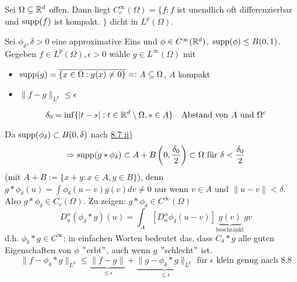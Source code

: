 \begin{kor} \label{kor:8.9}
	Sei $\Omega \subseteq \mathbb{R}^{d}$ offen. Dann liegt $C_{c}^{\infty}(\Omega) = \{ f : f $ ist unendlich oft differenzierbar und $\operatorname{supp}(f)$ ist kompakt. $\}$ dicht in $L^{p}(\Omega)$.
	\begin{beweis}
		Sei $\phi_{\delta}, \delta > 0$ eine approximative Eins und $\phi \in C^{\infty}(\mathbb{R}^{d})$, $\operatorname{supp}(\phi) \leq B(0, 1)$. \\
		Gegeben $f \in L^{p}(\Omega), \epsilon > 0$ wähle $g \in L^{\infty}(\Omega)$ mit
		\begin{itemize}
			\item $\operatorname{supp}(g) = \overline{\{ x \in \Omega: g(x) \neq 0 \}} =: A \subseteq \Omega$, $A$ kompakt
			\item $\| f - g \|_{L^{p}} \leq \epsilon$
		\end{itemize}
		\[ \delta_{0} = \inf \{ |t - s| : t \in \mathbb{R}^{d} \setminus \Omega, s \in A \} \quad \text{Abstand von } A \text{ und } \Omega^{c} \]

		\begin{figure}[H]
			\centering		
		\end{figure}
			
		Da $\operatorname{supp}(\phi_{\delta}) \subset B(0, \delta)$ nach \hyperref[bem:8.7ii]{8.7 ii)}
		\[ \Rightarrow \operatorname{supp}(g \ast \phi_{\delta} ) \subset A + B\left(0, \frac{\delta_{0}}{2}\right) \subset \Omega \text{ für } \delta < \frac{\delta_{0}}{2} \]
		(mit $A + B := \{ x + y : x \in A, y \in B\}$), denn $g \ast \phi_{\delta}(u) = \int \phi_{\delta}(u - v) g(v) dv \neq 0$ nur wenn $v \in A$ und $\| u - v \| < \delta$. \\
		Also $g \ast \phi_{\delta} \in C_{c}(\Omega)$. Zu zeigen: $g \ast \phi_{\delta} \in C^{\infty}(\Omega)$
		\[ D_{u}^{\alpha}(\phi_{\delta} \ast g)(u) = \int_{A} \left[ D_{u}^{\alpha} \phi_{\delta}(u - v) \right] \underbrace{g(v)}_{\text{beschränkt}} gv \]
		d.h. $\phi_{\delta} \ast g \in C	^{\infty}$; in einfachen Worten bedeutet das, dass $C_{\delta} \ast g$ alle guten Eigenschaften von $\phi$ $"$erbt$"$, auch wenn $g$ $"$schlecht$"$ ist. \\
		\[ \| f - \phi_{\delta} \ast g \|_{L^{p}} \leq \underbrace{\| f - g \|}_{\leq \epsilon} + \underbrace{\| g - \phi_{\delta} \ast g \|_{L^{p}}}_{\leq \epsilon} \text{ für } \epsilon \text{ klein genug nach } \hyperref[satz:8.8]{8.8} \]
	\end{beweis}
\end{kor}


